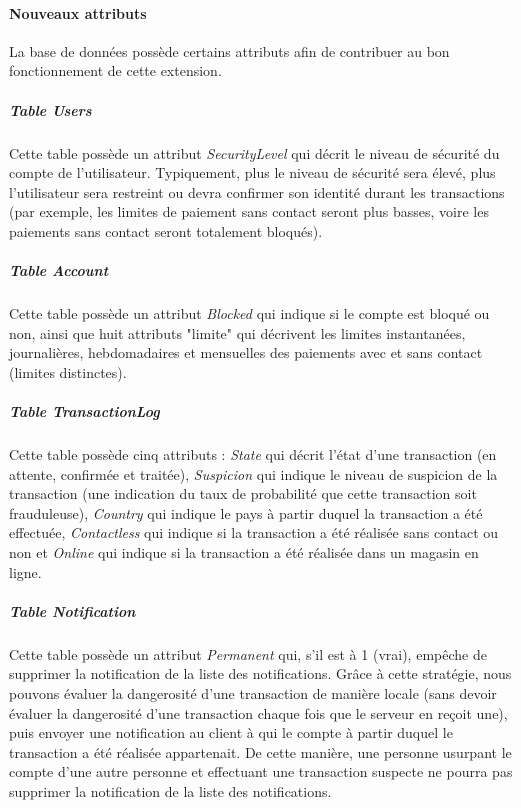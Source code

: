 \paragraph{Nouveaux attributs} La base de données possède certains attributs afin de contribuer au bon fonctionnement de cette extension.

\subparagraph{Table \emph{Users}} Cette table possède un attribut \emph{SecurityLevel} qui décrit le niveau de sécurité du compte de l'utilisateur. Typiquement, plus le niveau de sécurité sera élevé, plus l'utilisateur sera restreint ou devra confirmer son identité durant les transactions (par exemple, les limites de paiement sans contact seront plus basses, voire les paiements sans contact seront totalement bloqués).

\subparagraph{Table \emph{Account}} Cette table possède un attribut \emph{Blocked} qui indique si le compte est bloqué ou non, ainsi que huit attributs "limite" qui décrivent les limites instantanées, journalières, hebdomadaires et mensuelles des paiements avec et sans contact (limites distinctes).

\subparagraph{Table \emph{TransactionLog}} Cette table possède cinq attributs : \emph{State} qui décrit l'état d'une transaction (en attente, confirmée et traitée), \emph{Suspicion} qui indique le niveau de suspicion de la transaction (une indication du taux de probabilité que cette transaction soit frauduleuse), \emph{Country} qui indique le pays à partir duquel la transaction a été effectuée, \emph{Contactless} qui indique si la transaction a été réalisée sans contact ou non et \emph{Online} qui indique si la transaction a été réalisée dans un magasin en ligne.

\subparagraph{Table \emph{Notification}} Cette table possède un attribut \emph{Permanent} qui, s'il est à 1 (vrai), empêche de supprimer la notification de la liste des notifications. Grâce à cette stratégie, nous pouvons évaluer la dangerosité d'une transaction de manière locale (sans devoir évaluer la dangerosité d'une transaction chaque fois que le serveur en reçoit une), puis envoyer une notification au client à qui le compte à partir duquel le transaction a été réalisée appartenait. De cette manière, une personne usurpant le compte d'une autre personne et effectuant une transaction suspecte ne pourra pas supprimer la notification de la liste des notifications.